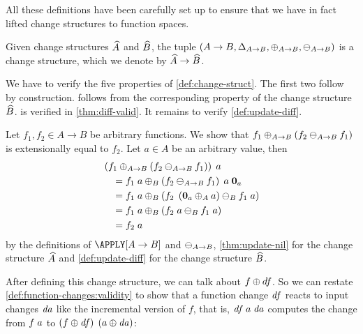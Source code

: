All these definitions have been carefully set up to ensure that we have
in fact lifted change structures to function spaces.


\begin{theorem}
  \label{thm:func-changestruct}
  Given change structures $\widehat{A}$ and $\widehat{B}$, the tuple $(A \to B, \CHANGE[A
  \to B], \UPDATE[A \to B], \DIFF[A \to B])$ is a
  change structure, which we denote by $\widehat{A} \to \widehat{B}$.
\end{theorem}

\begin{optionalproof}
  We have to verify the five properties of
  \cref{def:change-struct}. The first two follow by
  construction.  follows from the corresponding
  property of the change structure $\widehat{B}$.  is
  verified in \cref{thm:diff-valid}. It remains to verify
  \cref{def:update-diff}.

  Let $f_1, f_2 \in A \to B$ be arbitrary functions. We show that
  $\Apply[A \to B]{\Diff*[A \to B]{f_2}{f_1}}{f_1}$ is
  extensionally equal to $f_2$. Let $a \in A$ be an arbitrary
  value, then
  \begin{align*}
    & \App{\Apply*[A \to B]{\Diff*[A \to B]{f_2}{f_1}}{f_1}}{a}\\
    & \quad = \Apply[B]
                {\App{\App{\Diff*[A \to B]{f_2}{f_1}}{a}}{\NilC[A]{a}}}
                {\App{f_1}{a}}\\
    & \quad = \Apply[B]
                {\Diff*[B]{\App{f_2}{\Apply*[A]{a}{\NilC[A]{a}}}}{\App{f_1}{a}}}
                {\App{f_1}{a}}\\
    & \quad = \Apply[B]
                {\Diff*[B]{\App{f_2}{a}}{\App{f_1}{a}}}
                {\App{f_1}{a}}\\
    & \quad = \App{f_2}{a}
  \end{align*}
  by the definitions of $\APPLY[A \to B]$ and $\DIFF[A \to B]$,
  \cref{thm:update-nil} for the change structure $\widehat{A}$ and
  \cref{def:update-diff} for the change structure $\widehat{B}$.
\end{optionalproof}

After defining this change structure, we can talk about $f
\UPDATE df$. So we can restate \cref{def:function-changes:validity}
to show that a function change $\mathit{df}$ reacts to
%
input changes $\mathit{da}$ like the incremental version of $f$, that is,
$\App{\App{\D f}{a}}{\D a}$ computes the change from
$\App{f}{a}$ to
$\App{\Apply*{\D f}{f}}{\Apply*{\D a}{a}}$:


